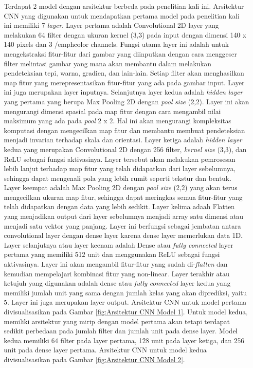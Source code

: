 Terdapat 2 model dengan arsitektur berbeda pada penelitian kali ini. Arsitektur CNN yang digunakan untuk mendapatkan pertama model pada penelitian kali ini memiliki 7 \emph{layer}. Layer pertama adalah Convolutional 2D layer yang melakukan 64 filter dengan ukuran kernel (3,3) pada input dengan dimensi 140 x 140 pixels dan 3 /emph{color channels}. Fungsi utama layer ini adalah untuk mengekstraksi fitur-fitur dari gambar yang diinputkan dengan cara menggeser filter melintasi gambar yang mana akan membantu dalam melakukan pendeteksian tepi, warna, gradien, dan lain-lain. Setiap filter akan menghasilkan map fitur yang merepresentasikan fitur-fitur yang ada pada gambar input. Layer ini juga merupakan layer inputnya. Selanjutnya layer kedua adalah \emph{hidden layer} yang pertama yang berupa Max Pooling 2D dengan \emph{pool size} (2,2). Layer ini akan mengurangi dimensi spasial pada map fitur dengan cara mengambil nilai maksimum yang ada pada \emph{pool} 2 x 2. Hal ini akan mengurangi kompleksitas komputasi dengan mengecilkan map fitur dan membantu membuat pendeteksian menjadi invarian terhadap skala dan orientasi. Layer ketiga adalah \emph{hidden layer} kedua yang merupakan Convolutional 2D dengan 256 filter, \emph{kernel size} (3,3), dan ReLU sebagai fungsi aktivasinya. Layer tersebut akan melakukan pemrosesan lebih lanjut terhadap map fitur yang telah didapatkan dari layer sebelumnya, sehingga dapat mengenali pola yang lebih rumit seperti tekstur dan bentuk. Layer keempat adalah Max Pooling 2D dengan \emph{pool size} (2,2) yang akan terus mengecilkan ukuran map fitur, sehingga dapat meringkas semua fitur-fitur yang telah didapatkan dengan data yang lebih sedikit. Layer kelima adaah Flatten yang menjadikan output dari layer sebelumnya menjadi array satu dimensi atau menjadi satu vektor yang panjang. Layer ini berfungsi sebagai jembatan antara convolutional layer dengan dense layer karena dense layer memerlukan data 1D. Layer selanjutnya atau layer keenam adalah Dense atau \emph{fully connected} layer pertama yang memiliki 512 unit dan menggunakan ReLU sebagai fungsi aktivasinya. Layer ini akan mengambil fitur-fitur yang sudah di-\emph{flatten} dan kemudian mempelajari kombinasi fitur yang non-linear. Layer terakhir atau ketujuh yang digunakan adalah dense atau \emph{fully connected} layer kedua yang memiliki jumlah unit yang sama dengan jumlah kelas yang akan diprediksi, yaitu 5. Layer ini juga merupakan layer output. Arsitektur CNN untuk model pertama divisualisasikan pada Gambar \ref{fig:Arsitektur CNN Model 1}. Untuk model kedua, memiliki arsitektur yang mirip dengan model pertama akan tetapi terdapat sedikit perbedaan pada jumlah filter dan jumlah unit pada dense layer. Model kedua memiliki 64 filter pada layer pertama, 128 unit pada layer ketiga, dan 256 unit pada dense layer pertama. Arsitektur CNN untuk model kedua divisualisasikan pada Gambar \ref{fig:Arsitektur CNN Model 2}.


